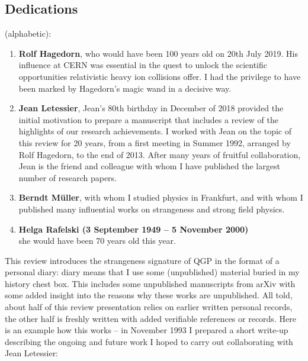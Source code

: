 \vskip 10cm
\subsection*{Dedications} (alphabetic):
%
\begin{enumerate}
\item 
{\bf Rolf Hagedorn}, who would have been 100 years old on 20th July 2019. His influence at CERN was essential in the quest to unlock the scientific opportunities relativistic heavy ion collisions offer. I had the privilege to have been marked by Hagedorn\rq s magic wand in a decisive way. 
\item 
\textbf{Jean Letessier}, Jean\rq s 80th birthday in December of 2018 provided the initial motivation to prepare a manuscript that includes a review of the highlights of our research achievements. I worked with Jean on the topic of this review for 20 years, from a first meeting in Summer 1992, arranged by Rolf Hagedorn, to the end of 2013. After many years of fruitful collaboration, Jean is the friend and colleague with whom I have published the largest number of research papers. 
\item
{\bf Berndt M\"uller}, with whom I studied physics in Frankfurt, and with whom I published many influential works on strangeness and strong field physics. 
\item
{\bf Helga Rafelski (3 September 1949 -- 5 November 2000)}\\ she would have been 70 years old this year. 
\end{enumerate}
\vfill\eject
%
This review introduces the strangeness signature of QGP in the format of a personal diary: diary means that I use some (unpublished) material buried in my history chest box. This includes some unpublished manuscripts from arXiv with some added insight into the reasons why these works are unpublished. All told, about half of this review presentation relies on earlier written personal records, the other half is freshly written with added verifiable references or records. Here is an example how this works -- in November 1993 I prepared a short write-up describing the ongoing and future work I hoped to carry out collaborating with Jean Letessier:\\


